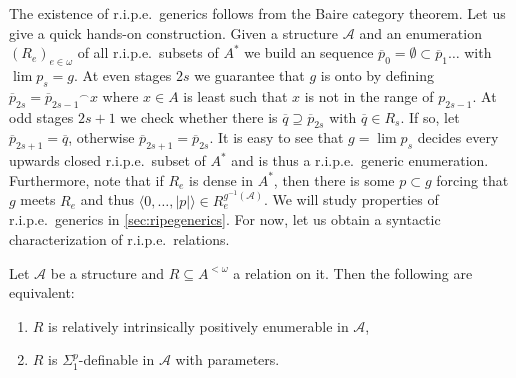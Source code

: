 \documentclass[11pt]{amsart}
\providecommand{\tightlist}{%
  \setlength{\itemsep}{0 pt}\setlength{\parskip}{0 pt}}
\newcommand{\A}{{\mathcal{A}}}
\renewcommand{\bar}[1]{\overline{#1}}
\begin{document}
The existence of r.i.p.e.\ generics follows from the Baire category theorem. Let us give a quick hands-on construction. Given a structure $\A$ and an enumeration $(R_e)_{e\in\omega}$ of all r.i.p.e.\ subsets of $A^*$ we build an sequence $\bar p_0=\emptyset\subset \bar p_1\dots$ with $\lim p_s=g$. At even stages $2s$ we guarantee that $g$ is onto by defining $\bar p_{2s}={\bar p_{2s-1}}^\smallfrown x$ where $x\in A$ is least such that $x$ is not in the range of $p_{2s-1}$. At odd stages $2s+1$ we check whether there is $\bar q\supseteq\bar p_{2s}$ with $\bar q\in R_s$. If so, let $\bar p_{2s+1}=\bar q$, otherwise $\bar p_{2s+1}=\bar p_{2s}$. It is easy to see that $g=\lim p_s$ decides every upwards closed r.i.p.e.\ subset of $A^*$ and is thus a r.i.p.e.\ generic enumeration. Furthermore, note that if $R_e$ is dense in $A^*$, then there is some $p\subset g$ forcing that $g$ meets $R_e$ and thus $\langle 0,\dots,|p|\rangle\in R_e^{g^{-1}(\A)}$. We will study properties of r.i.p.e.\ generics in \cref{sec:ripegenerics}. For now, let us obtain a syntactic characterization of r.i.p.e.\ relations.
\begin{thm}\label{ripe}
    Let $\A$ be a structure and $R \subseteq A^{< \omega}$ a relation on it. Then the following are equivalent:
    \begin{enumerate}\tightlist
        \item[(i)] $R$ is relatively intrinsically positively enumerable in $\A$,
        \item[(ii)] $R$ is $\Sigma^p_1$-definable in $\A$ with parameters.
    \end{enumerate}
\end{thm}
\end{document}

